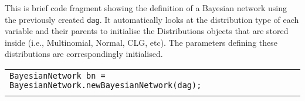 This is brief code fragment showing the definition of a Bayesian network using the previously created \texttt{dag}. It automatically looks at the distribution type of each variable and their parents to initialise the Distributions objects that are stored inside (i.e., Multinomial, Normal, CLG, etc). The parameters defining these distributions are correspondingly initialised.

\begin{table}[H]
\begin{tabular}{l} \hline

        \texttt{BayesianNetwork bn = BayesianNetwork.newBayesianNetwork(dag);}\\ \\ \hline 

\end{tabular}
\end{table}        